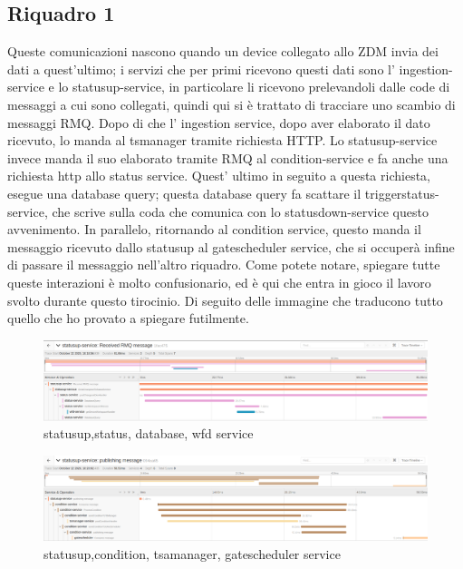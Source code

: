 \documentclass[a4paper,12pt,titlepage,italian,openany]{report}
\begin{document}
\subsection{Riquadro 1}
Queste comunicazioni nascono quando un device collegato allo ZDM\cite{zdm:1} invia dei dati a quest'ultimo; i servizi che per primi ricevono questi dati sono l' ingestion-service e lo statusup-service, in particolare li ricevono prelevandoli dalle code di messaggi a cui sono collegati, quindi qui si è trattato di tracciare uno scambio di messaggi RMQ. Dopo di che l' ingestion service, dopo aver elaborato il dato ricevuto, lo manda al tsmanager tramite richiesta HTTP. Lo statusup-service invece manda il suo elaborato tramite RMQ al condition-service e fa anche una richiesta http allo status service. Quest' ultimo in seguito a questa richiesta, esegue una database query; questa database query fa scattare il triggerstatus-service, che scrive sulla coda che comunica con lo statusdown-service questo avvenimento. In parallelo, ritornando al condition service, questo manda il messaggio ricevuto dallo statusup al gatescheduler service, che si occuperà infine di passare il messaggio nell'altro riquadro. Come potete notare, spiegare tutte queste interazioni è molto confusionario, ed è qui che entra in gioco il lavoro svolto durante questo tirocinio. Di seguito delle immagine che traducono tutto quello che ho provato a spiegare futilmente.
\begin{figure}[H]
    \includegraphics[scale=0.21]{49.png}
    \centering
    \caption{statusup,status, database, wfd service}
    
\end{figure}
\begin{figure}[H]
    \includegraphics[scale=0.21]{51.png}
    \centering
    \caption{statusup,condition, tsamanager, gatescheduler service}
    
\end{figure}
\end{document}
